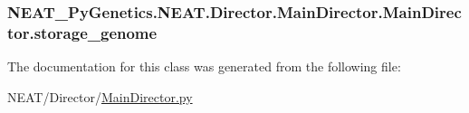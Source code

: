 \subsubsection[{\texorpdfstring{storage\+\_\+genome}{storage_genome}}]{\setlength{\rightskip}{0pt plus 5cm}N\+E\+A\+T\+\_\+\+Py\+Genetics.\+N\+E\+A\+T.\+Director.\+Main\+Director.\+Main\+Director.\+storage\+\_\+genome\hspace{0.3cm}{\ttfamily [static]}}\hypertarget{classNEAT__PyGenetics_1_1NEAT_1_1Director_1_1MainDirector_1_1MainDirector_ac579f78b49d7a2711bf925459dd1266d}{}\label{classNEAT__PyGenetics_1_1NEAT_1_1Director_1_1MainDirector_1_1MainDirector_ac579f78b49d7a2711bf925459dd1266d}


The documentation for this class was generated from the following file\+:\begin{DoxyCompactItemize}
\item 
N\+E\+A\+T/\+Director/\hyperlink{MainDirector_8py}{Main\+Director.\+py}\end{DoxyCompactItemize}

